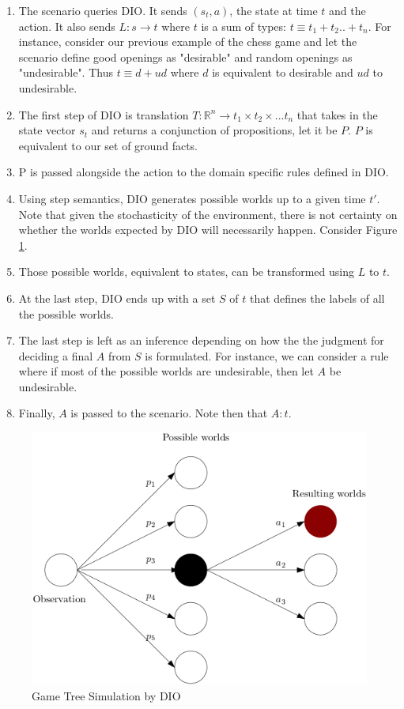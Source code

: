 \documentclass[a4paper,11pt]{article}
\begin{document}
\begin{enumerate}
  \item The scenario queries DIO. It sends $(s_t, a)$, the state at time $t$ and the action. It also sends $L : s \rightarrow t$ where $t$ is a sum of types: 
        $t \equiv t_1 + t_2 .. + t_n$. For instance, consider our previous example of the chess game and let the scenario define good openings as "desirable" and random openings as 
        "undesirable". Thus $t \equiv d + ud$ where $d$ is equivalent to desirable and $ud$ to undesirable. 
  \item The first step of DIO is translation $T : \mathbb{R}^n \rightarrow t_1 \times t_2 \times ... t_n$ that takes in the state vector $s_t$ and returns a conjunction of propositions, let it be $P$. $P$ is equivalent to 
        our set of ground facts.
  \item P is passed alongside the action to the domain specific rules defined in DIO. 
  \item Using step semantics, DIO generates possible worlds up to a given time $t'$. Note that given the stochasticity of the environment, there is not certainty on
        whether the worlds expected by DIO will necessarily happen. Consider Figure \ref{fig:diosim}.
  \item Those possible worlds, equivalent to states, can be transformed using $L$ to $t$. 
  \item At the last step, DIO ends up with a set $S$ of $t$ that defines the labels of all the possible worlds.
  \item The last step is left as an inference depending on how the the judgment for deciding a final $A$ from $S$ 
        is formulated. For instance, we can consider a rule where if most of the possible worlds are undesirable, then let $A$ be undesirable.
  \item Finally, $A$ is passed to the scenario. Note then that $A : t$. 
\end{enumerate}

\begin{figure}[H]
  \centering
  \includegraphics[scale=0.55]{scworlds.png}
  \caption{Game Tree Simulation by DIO}
  \label{fig:diosim}
\end{figure}
\end{document}
